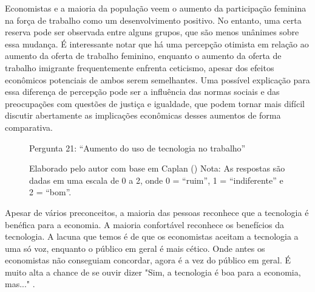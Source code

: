 Economistas e a maioria da população veem o aumento da participação feminina na força de trabalho como um desenvolvimento positivo. No entanto, uma certa reserva pode ser observada entre alguns grupos, que são menos unânimes sobre essa mudança. É interessante notar que há uma percepção otimista em relação ao aumento da oferta de trabalho feminino, enquanto o aumento da oferta de trabalho imigrante frequentemente enfrenta ceticismo, apesar dos efeitos econômicos potenciais de ambos serem semelhantes. Uma possível explicação para essa diferença de percepção pode ser a influência das normas sociais e das preocupações com questões de justiça e igualdade, que podem tornar mais difícil discutir abertamente as implicações econômicas desses aumentos de forma comparativa.


\begin{figure}[H]
    \centering
    \caption*{Pergunta 21: “Aumento do uso de tecnologia no trabalho”}
    \caption{Elaborado pelo autor com base em Caplan (\citeyear{The_Myth_of_the_Rational_Voter}) \newline
    Nota: As respostas são dadas em uma escala de 0 a 2, onde 0 = “ruim”, 1 = “indiferente” e 2 = “bom”.}
    \label{fig:pergunta_21}
\end{figure}

Apesar de vários preconceitos, a maioria das pessoas reconhece que a tecnologia é benéfica para a economia. A maioria confortável reconhece os benefícios da tecnologia. A lacuna que temos é de que os economistas aceitam a tecnologia a uma só voz, enquanto o público em geral é mais cético. Onde antes os economistas não conseguiam concordar, agora é a vez do público em geral. É muito alta a chance de se ouvir dizer "Sim, a tecnologia é boa para a economia, mas..." \cite{The_Myth_of_the_Rational_Voter}.

